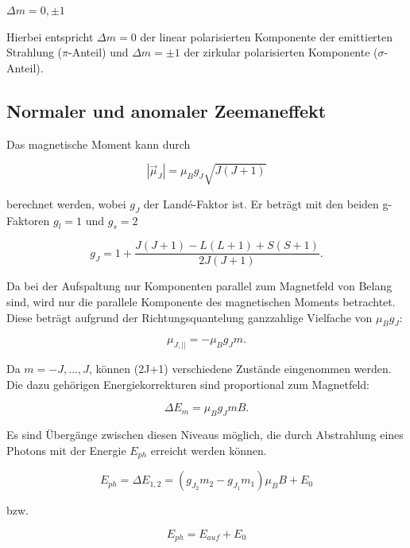 \begin{center}
	$\Delta m = 0 ,\pm 1$
\end{center}

Hierbei entspricht $\Delta m = 0$ der linear polarisierten Komponente der emittierten Strahlung ($\pi$-Anteil) und $\Delta m = \pm 1$
der zirkular polarisierten Komponente ($\sigma$-Anteil).

\subsection{Normaler und anomaler Zeemaneffekt}

Das magnetische Moment kann durch

\begin{equation}
	|\vec{\mu}_J| = \mu_B g_J \sqrt{J(J+1)}
\end{equation}

berechnet werden, wobei $g_J$ der Landé-Faktor ist. Er beträgt mit den beiden g-Faktoren $g_l=1$ und $g_s=2$

\begin{equation}
	g_J = 1 + \frac{J(J+1) - L(L+1) + S(S+1)}{2J(J+1)} .
\end{equation}

Da bei der Aufspaltung nur Komponenten parallel zum Magnetfeld von Belang sind, wird nur die parallele Komponente des
magnetischen Moments betrachtet. Diese beträgt aufgrund der Richtungsquantelung ganzzahlige Vielfache von $\mu_B g_J$:

\begin{equation}
 \mu_{J,||} = -\mu_B g_J m .
\end{equation}

Da $m = -J, ..., J$, können (2J+1) verschiedene Zustände eingenommen werden. Die dazu gehörigen Energiekorrekturen
sind proportional zum Magnetfeld:

\begin{equation}
 \Delta E_m = \mu_B g_J m B .
\end{equation}

Es sind Übergänge zwischen diesen Niveaus möglich, die durch Abstrahlung eines Photons mit der Energie $E_{ph}$
erreicht werden können.

\begin{equation}
	E_{ph} = \Delta E_{1,2} = (g_{J_2} m_2 - g_{J_1} m_1) \mu_B B + E_0
\end{equation}

bzw.

\begin{equation}
	E_{ph} = E_{auf} + E_0
\end{equation}

